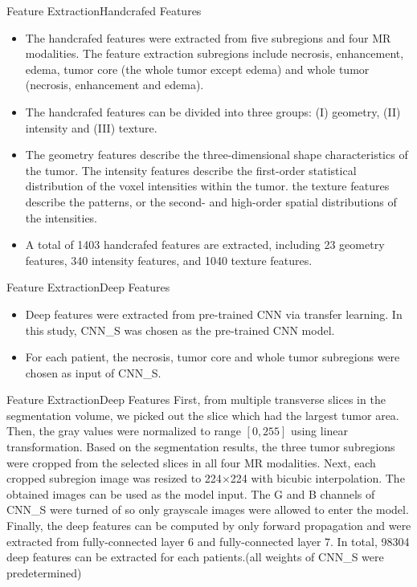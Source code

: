 \documentclass[
]{beamer}
\begin{document}
	\begin{frame}{Feature Extraction}{Handcrafed Features}
		\begin{itemize}
			\item The handcrafed features were extracted from five subregions
			and four MR modalities. The feature extraction subregions include necrosis, enhancement, edema, tumor core
			(the whole tumor except edema) and whole tumor (necrosis, enhancement and edema). 
			\item The handcrafed features
			can be divided into three groups: (I) geometry, (II) intensity and (III) texture. 
			\item The geometry features describe the three-dimensional shape characteristics of the tumor. The intensity features describe the first-order statistical distribution of the voxel intensities within the tumor. the texture features describe the patterns, or the second- and high-order spatial distributions of the intensities.
			\item A total of
			1403 handcrafed features are extracted, including 23 geometry features, 340 intensity features, and 1040 texture
			features. 
		\end{itemize}
	\end{frame}
	
	
	\begin{frame}{Feature Extraction}{Deep Features}
		\begin{itemize}
			\item Deep features were extracted from pre-trained CNN via transfer learning. In this study, CNN\_S
			was chosen as the pre-trained CNN model.
			\item For each patient, the necrosis, tumor core and whole tumor subregions were chosen
			as input of CNN\_S.
		\end{itemize}
	\end{frame}
	
	\begin{frame}{Feature Extraction}{Deep Features}
		First, from multiple transverse slices in the segmentation volume, we picked out the slice
		which had the largest tumor area. Then, the gray values were normalized to range 
		$\left[0, 255\right]$ using linear transformation.
		Based on the segmentation results, the three tumor subregions were cropped from the selected slices
		in all four MR modalities. Next, each cropped subregion image was resized to 224$\times$224 with bicubic interpolation.
		The obtained images can be used as the model input. The G and B channels of CNN\_S were turned of
		so only grayscale images were allowed to enter the model. Finally, the deep features can be computed by only
		forward propagation and were extracted from fully-connected layer 6 and fully-connected layer 7.  In total, 98304 deep features can be extracted for each patients.(all weights of CNN\_S were predetermined)
	\end{frame}
	
\end{document}
